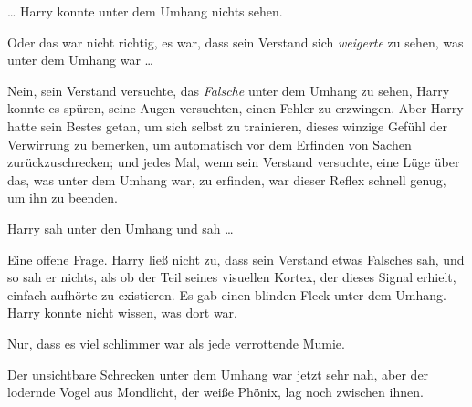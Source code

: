 … Harry konnte unter dem Umhang nichts sehen.

Oder das war nicht richtig, es war, dass sein Verstand sich \emph{weigerte} zu sehen, was unter dem Umhang war …

Nein, sein Verstand versuchte, das \emph{Falsche} unter dem Umhang zu sehen, Harry konnte es spüren, seine Augen versuchten, einen Fehler zu erzwingen. Aber Harry hatte sein Bestes getan, um sich selbst zu trainieren, dieses winzige Gefühl der Verwirrung zu bemerken, um automatisch vor dem Erfinden von Sachen zurückzuschrecken; und jedes Mal, wenn sein Verstand versuchte, eine Lüge über das, was unter dem Umhang war, zu erfinden, war dieser Reflex schnell genug, um ihn zu beenden.

Harry sah unter den Umhang und sah …

Eine offene Frage. Harry ließ nicht zu, dass sein Verstand etwas Falsches sah, und so sah er nichts, als ob der Teil seines visuellen Kortex, der dieses Signal erhielt, einfach aufhörte zu existieren. Es gab einen blinden Fleck unter dem Umhang. Harry konnte nicht wissen, was dort war.

Nur, dass es viel schlimmer war als jede verrottende Mumie.

Der unsichtbare Schrecken unter dem Umhang war jetzt sehr nah, aber der lodernde Vogel aus Mondlicht, der weiße Phönix, lag noch zwischen ihnen.

